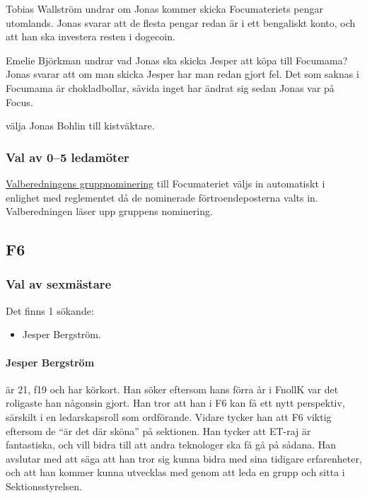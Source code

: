 \documentclass[hidelinks]{sektionsmote}
\begin{document}
Tobias Wallström undrar om Jonas kommer skicka Focumateriets pengar utomlands.
Jonas svarar att de flesta pengar redan är i ett bengaliskt konto, och att han ska investera resten i dogecoin.

Emelie Björkman undrar vad Jonas ska skicka Jesper att köpa till Focumama?
Jonas svarar att om man skicka Jesper har man redan gjort fel.
Det som saknas i Focumama är chokladbollar, såvida inget har ändrat sig sedan Jonas var på Focus.

\begin{beslut}
  \item välja Jonas Bohlin till kistväktare.
\end{beslut}

\subsubsection{Val av 0--5 ledamöter}
\hyperlink{bilagor/nom/foc.pdf.1}{Valberedningens gruppnominering} till Focumateriet väljs in automatiskt i enlighet med reglementet då de nominerade förtroendeposterna valts in.
Valberedningen läser upp gruppens nominering.

\subsection{F6}

\subsubsection{Val av sexmästare}
Det finns 1 sökande:
\begin{itemize}
    \item Jesper Bergström.
\end{itemize}

\paragraph{Jesper Bergström} är 21, f19 och har körkort.
Han söker eftersom hans förra år i FnollK var det roligaste han någonsin gjort.
Han tror att han i F6 kan få ett nytt perspektiv, särskilt i en ledarskapsroll som ordförande.
Vidare tycker han att F6 viktig eftersom de \enquote{är det där sköna} på sektionen.
Han tycker att ET-raj är fantastiska, och vill bidra till att andra teknologer ska få gå på sådana.
Han avslutar med att säga att han tror sig kunna bidra med sina tidigare erfarenheter, och att han kommer kunna utvecklas med genom att leda en grupp och sitta i Sektionsstyrelsen.
\end{document}
